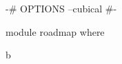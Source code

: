 \documentclass[11pt, a4paper]{article}
\begin{document}
\begin{code}[hide]
{-# OPTIONS --cubical #-}

module roadmap where
\end{code}

















% 



b

\newpage




\newpage


\end{document}
